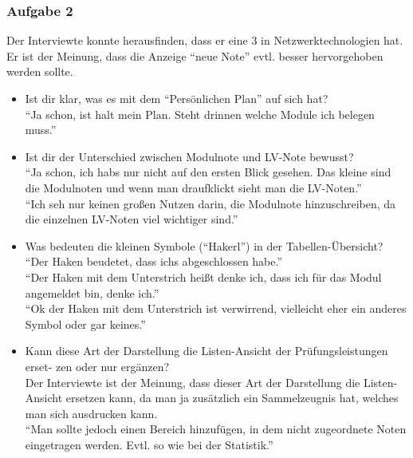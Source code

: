 \documentclass[a4paper,10pt]{scrartcl}
\begin{document}
\subsubsection*{Aufgabe 2}

Der Interviewte konnte herausfinden, dass er eine 3 in Netzwerktechnologien hat. Er ist der Meinung, dass die Anzeige ``neue Note'' evtl. besser hervorgehoben werden sollte.
\begin{itemize}

\item  Ist dir klar, was es mit dem “Persönlichen Plan” auf sich hat? \\

``Ja schon, ist halt mein Plan. Steht drinnen welche Module ich belegen muss.''\\


\item  Ist dir der Unterschied zwischen Modulnote und LV-Note bewusst? \\

``Ja schon, ich habs nur nicht auf den ersten Blick gesehen. Das kleine sind die Modulnoten und wenn man draufklickt sieht man die LV-Noten.''\\

``Ich seh nur keinen großen Nutzen darin, die Modulnote hinzuschreiben, da die einzelnen LV-Noten viel wichtiger sind.''

\item  Was bedeuten die kleinen Symbole (“Hakerl”) in der Tabellen-Übersicht? \\

``Der Haken beudetet, dass ichs abgeschlossen habe.''\\

``Der Haken mit dem Unterstrich heißt denke ich, dass ich für das Modul angemeldet bin, denke ich.''\\

``Ok der Haken mit dem Unterstrich ist verwirrend, vielleicht eher ein anderes Symbol oder gar keines.''


\item  Kann diese Art der Darstellung die Listen-Ansicht der Prüfungsleistungen erset-
zen oder nur ergänzen? \\

Der Interviewte ist der Meinung, dass dieser Art der Darstellung die Listen-Ansicht ersetzen kann, da man ja zusätzlich ein Sammelzeugnis hat, welches man sich ausdrucken kann.
\\
``Man sollte jedoch einen Bereich hinzufügen, in dem nicht zugeordnete Noten eingetragen werden. Evtl. so wie bei der Statistik.''


\end{itemize}
\end{document}
